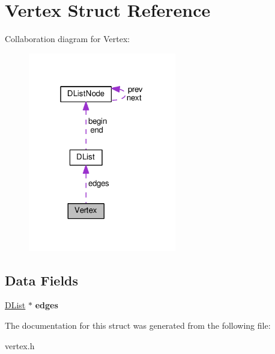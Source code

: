 \hypertarget{struct_vertex}{}\section{Vertex Struct Reference}
\label{struct_vertex}


Collaboration diagram for Vertex\+:
\nopagebreak
\begin{figure}[H]
\begin{center}
\leavevmode
\includegraphics[width=183pt]{struct_vertex__coll__graph}
\end{center}
\end{figure}
\subsection*{Data Fields}
\begin{DoxyCompactItemize}
\item 
\hyperlink{struct_d_list}{D\+List} $\ast$ {\bfseries edges}\hypertarget{struct_vertex_aec81987ffc4d5d098e9f52e4f2d69c9b}{}\label{struct_vertex_aec81987ffc4d5d098e9f52e4f2d69c9b}

\end{DoxyCompactItemize}


The documentation for this struct was generated from the following file\+:\begin{DoxyCompactItemize}
\item 
vertex.\+h\end{DoxyCompactItemize}
